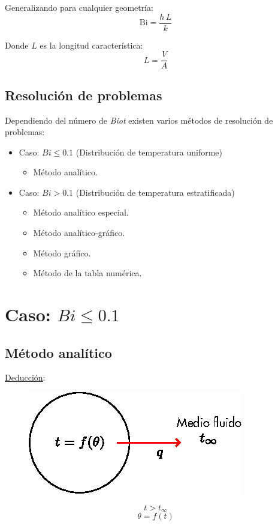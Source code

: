 Generalizando para cualquier geometría:
\begin{equation}
    \text{Bi} = \frac{h\,L}{k}
\end{equation}

Donde $L$ es la longitud característica:
\begin{equation}
    L = \frac{V}{A}
\end{equation}

\subsection{Resolución de problemas}
Dependiendo del número de \emph{Biot} existen varios métodos de resolución de
problemas:

\begin{itemize}
    \item Caso: $Bi\leq 0.1$ (Distribución de temperatura uniforme)
        \begin{itemize}
            \item Método analítico.
        \end{itemize}
    \item Caso: $Bi>0.1$ (Distribución de temperatura estratificada)
        \begin{itemize}
            \item Método analítico especial.
            \item Método analítico-gráfico.
            \item Método gráfico.
            \item Método de la tabla numérica.
        \end{itemize}
\end{itemize}

\section{Caso: $Bi\leq 0.1$}
\subsection{Método analítico}
\underline{Deducción}:
\begin{figure}[!h]
\centering
\includegraphics[scale=1.25]{figura03_04.eps}
\end{figure}
\begin{equation*}
    t > t_{\infty}
\end{equation*}
\begin{equation*}
    \theta = f(t)
\end{equation*}

